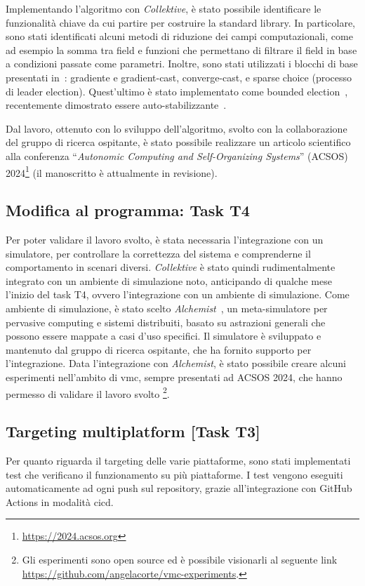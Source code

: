 \documentclass[13pt, a4paper]{article}
\newcommand{\ck}{\emph{Collektive}}
\begin{document}
Implementando l'algoritmo con \ck{},
è stato possibile identificare le funzionalità chiave da cui partire per costruire la standard library.
%
In particolare,
sono stati identificati alcuni metodi di riduzione dei campi computazionali, come ad esempio la somma tra field
e funzioni che permettano di filtrare il field in base a condizioni passate come parametri.
%
Inoltre, sono stati utilizzati i blocchi di base presentati in~\cite{TOMACS2018}:
gradiente e gradient-cast, converge-cast, e sparse choice (processo di leader election).
%
Quest'ultimo è stato implementato come bounded election~\cite{PianiniCV22},
recentemente dimostrato essere auto-stabilizzante~\cite{Dijkstra74}.

Dal lavoro,
ottenuto con lo sviluppo dell'algoritmo,
svolto con la collaborazione del gruppo di ricerca ospitante,
è stato possibile realizzare un articolo scientifico alla conferenza
``\emph{Autonomic Computing and Self-Organizing Systems}'' (ACSOS) 2024\footnote{\url{https://2024.acsos.org}}
(il manoscritto è attualmente in revisione).

\subsection{Modifica al programma: Task T4}\label{subsec:modifica-al-programma:-task-t4}

Per poter validare il lavoro svolto, è stata necessaria l'integrazione con un simulatore,
    per controllare la correttezza del sistema e comprenderne il comportamento in scenari diversi.
%
\ck{} è stato quindi rudimentalmente integrato con un ambiente di simulazione noto,
anticipando di qualche mese l'inizio del task T4, ovvero l'integrazione con un ambiente di simulazione.
%
Come ambiente di simulazione, è stato scelto \emph{Alchemist}~\cite{PianiniJOS2013},
un meta-simulatore per pervasive computing e sistemi distribuiti,
basato su astrazioni generali che possono essere mappate a casi d'uso specifici.
%
Il simulatore è sviluppato e mantenuto dal gruppo di ricerca ospitante,
che ha fornito supporto per l'integrazione.
%
Data l'integrazione con \emph{Alchemist}, è stato possibile creare alcuni esperimenti nell'ambito di \ac{vmc},
    sempre presentati ad ACSOS 2024, che hanno permesso di validare il lavoro svolto \footnote{
    Gli esperimenti sono open source ed è possibile visionarli al seguente link \url{https://github.com/angelacorte/vmc-experiments}.
}.

\subsection{Targeting multiplatform [Task T3]}\label{subsec:task-t3-[targeting-multiplatform]}
Per quanto riguarda il targeting delle varie piattaforme,
    sono stati implementati test che verificano il funzionamento su più piattaforme.
%
I test vengono eseguiti automaticamente ad ogni push sul repository, grazie all'integrazione con GitHub Actions in modalità \ac{cicd}.
\end{document}
